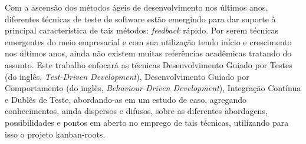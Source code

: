 \begin{resumo}
Com a ascensão dos métodos ágeis de desenvolvimento nos últimos anos, diferentes técnicas de teste de software estão emergindo para dar suporte à principal característica de tais métodos: \textit{feedback} rápido. Por serem técnicas emergentes do meio empresarial e com sua utilização tendo início e crescimento nos últimos anos, ainda não existem muitas referências acadêmicas tratando do assunto. Este trabalho enfocará as técnicas Desenvolvimento Guiado por Testes (do inglês, \textit{Test-Driven Development}), Desenvolvimento Guiado por Comportamento (do inglês, \textit{Behaviour-Driven Development}), Integração Contínua e Dublês de Teste, abordando-as em um estudo de caso, agregando conhecimentos, ainda dispersos e difusos, sobre as diferentes abordagens, possibilidades e pontos em aberto no emprego de tais técnicas, utilizando para isso o projeto kanban-roots.
\end{resumo}